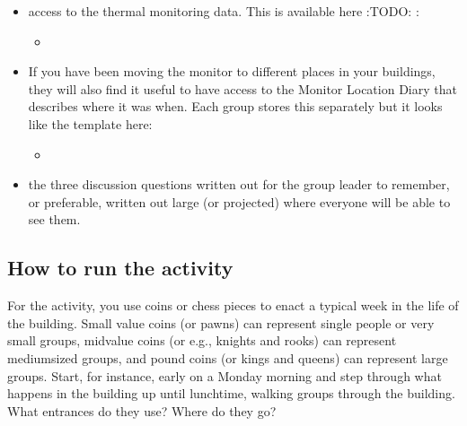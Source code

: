 \documentclass[letterpaper,10pt,english]{jupyterBook}
\begin{document}
\begin{itemize}
\item {} 
\sphinxAtStartPar
access to the thermal monitoring data.  This is available here :TODO: :
\begin{itemize}
\item {} 
\sphinxAtStartPar
{}

\end{itemize}

\item {} 
\sphinxAtStartPar
If you have been moving the monitor to different places in your buildings, they will also find it useful to have access to the Monitor Location Diary that describes where it was when.  Each group stores this separately but it looks like the template here:
\begin{itemize}
\item {} 
\sphinxAtStartPar
{}

\end{itemize}

\end{itemize}


\begin{itemize}
\item {} 
\sphinxAtStartPar
the three discussion questions written out for the group leader to remember, or preferable, written out large (or projected) where everyone will be able to see them.

\end{itemize}


\subsection{How to run the activity}
\label{\detokenize{session3/details/activity:how-to-run-the-activity}}
\sphinxAtStartPar
For the activity, you use coins or chess pieces to enact a typical week in the life of the building.  Small value coins (or pawns) can represent single people or very small groups, mid\sphinxhyphen{}value coins (or e.g., knights and rooks) can represent medium\sphinxhyphen{}sized groups, and pound coins (or kings and queens) can represent large groups.  Start, for instance, early on a Monday morning and step through what happens in the building up until lunchtime, walking groups through the building. What entrances do they use?  Where do they go?
\end{document}
